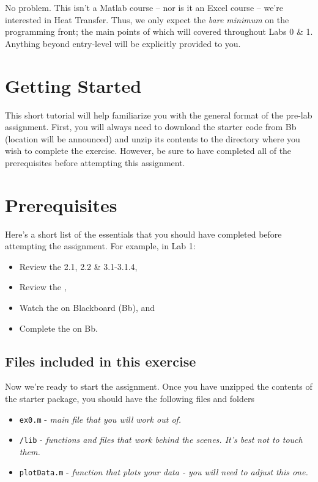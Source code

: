 \documentclass[11pt, letterpaper]{article}
\begin{document}
No problem. This isn't a Matlab course --  nor is it an Excel course -- we're interested in Heat Transfer.  Thus, we only expect the \textit{bare minimum} on the programming front; the main points of which will covered throughout Labs 0 \& 1. Anything beyond entry-level will be explicitly provided to you.



\section*{Getting Started}
This short tutorial will help familiarize you with the general format of the pre-lab assignment. First, you will always need to download the starter code from Bb (location will be announced) and unzip its contents to the directory where you wish to complete the exercise. However, be sure to have completed all of the prerequisites before attempting this assignment.

\section*{Prerequisites}
Here's a short list of the essentials that you should have completed before attempting the assignment. For example, in Lab 1:
{\small
\begin{itemize}
    \item Review the  2.1, 2.2 \& 3.1-3.1.4,
    \item Review the , 
    \item Watch the  on Blackboard (Bb), and
    \item Complete the  on Bb.
\end{itemize}
}


\subsection*{Files included in this exercise}
Now we're ready to start the assignment. Once you have unzipped the contents of the starter package, you should have the following files and folders

\begin{itemize}
\renewcommand\labelitemi{-- }
   \item \texttt{ex0.m} - \it{main file that you will work out of.}
    \item \texttt{/lib} - \it{functions and files that work behind the scenes. It's best not to touch them.}
\renewcommand\labelitemi{[$\star$]}
    \item \texttt{plotData.m} - \it{function that plots your data - you will need to adjust this one.}
\end{itemize}
\end{document}
